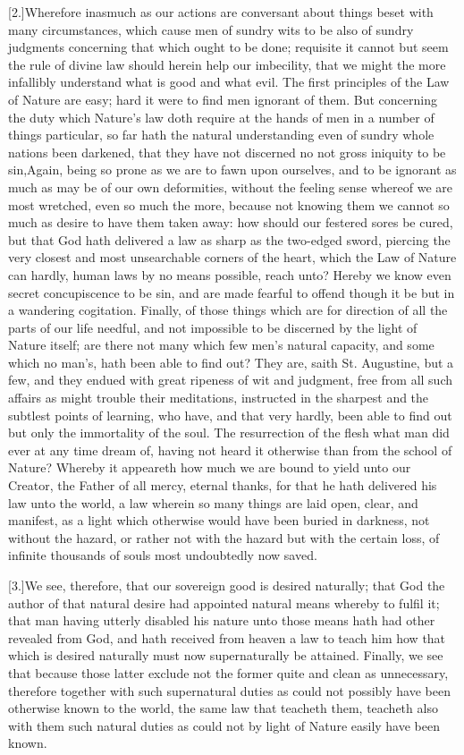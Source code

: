 [2.]Wherefore inasmuch as our actions are conversant about things beset with many circumstances, which cause men of sundry wits to be also of sundry judgments concerning that which ought to be done; requisite it cannot but seem the rule of divine law should herein help our imbecility, that we might the more infallibly understand what is good and what evil. The first principles of the Law of Nature are easy; hard it were to find men ignorant of them. But concerning the duty which Nature’s law doth require at the hands of men in a number of things particular, so far hath the natural understanding even of sundry whole nations been darkened, that they have not discerned no not gross iniquity to be sin,Again, being so prone as we are to fawn upon ourselves, and to be ignorant as much as may be of our own deformities, without the feeling sense whereof we are most wretched, even so much the more, because not knowing them we cannot so much as desire to have them taken away: how should our festered sores be cured, but that God hath delivered a law as sharp as the two-edged sword, piercing the very closest and most unsearchable corners of the heart, which the Law of Nature can hardly, human laws by no means possible, reach unto? Hereby we know even secret concupiscence to be sin, and are made fearful to offend though it be but in a wandering cogitation. Finally, of those things which are for direction of all the parts of our life needful, and not impossible to be discerned by the  light of Nature itself; are there not many which few men’s natural capacity, and some which no man’s, hath been able to find out? They are, saith St. Augustine, but a few, and they endued with great ripeness of wit and judgment, free from all such affairs as might trouble their meditations, instructed in the sharpest and the subtlest points of learning, who have, and that very hardly, been able to find out but only the immortality of the soul. The resurrection of the flesh what man did ever at any time dream of, having not heard it otherwise than from the school of Nature? Whereby it appeareth how much we are bound to yield unto our Creator, the Father of all mercy, eternal thanks, for that he hath delivered his law unto the world, a law wherein so many things are laid open, clear, and manifest, as a light which otherwise would have been buried in darkness, not without the hazard, or rather not with the hazard but with the certain loss, of infinite thousands of souls most undoubtedly now saved.

[3.]We see, therefore, that our sovereign good is desired naturally; that God the author of that natural desire had appointed natural means whereby to fulfil it; that man having utterly disabled his nature unto those means hath had other revealed from God, and hath received from heaven a law to teach him how that which is desired naturally must now supernaturally be attained. Finally, we see that because those latter exclude not the former quite and clean as unnecessary, therefore together with such supernatural duties as could not possibly have been otherwise known to the world, the same law that teacheth them, teacheth also with them such natural duties as could not by light of Nature easily have been known.

